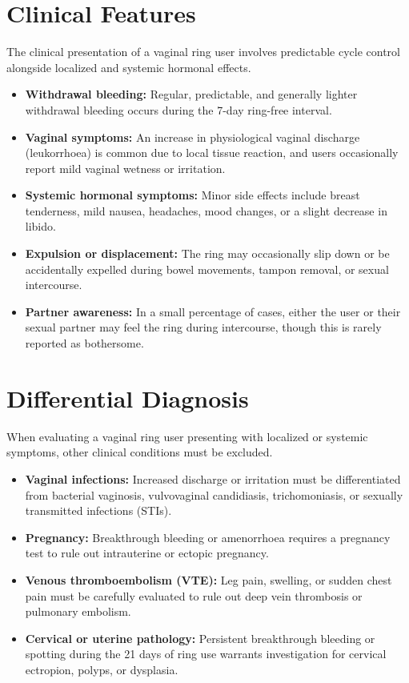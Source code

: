 \section*{Clinical Features}
The clinical presentation of a vaginal ring user involves predictable cycle control alongside localized and systemic hormonal effects.
\begin{itemize}
    \item \textbf{Withdrawal bleeding:} Regular, predictable, and generally lighter withdrawal bleeding occurs during the 7-day ring-free interval.
    \item \textbf{Vaginal symptoms:} An increase in physiological vaginal discharge (leukorrhoea) is common due to local tissue reaction, and users occasionally report mild vaginal wetness or irritation.
    \item \textbf{Systemic hormonal symptoms:} Minor side effects include breast tenderness, mild nausea, headaches, mood changes, or a slight decrease in libido.
    \item \textbf{Expulsion or displacement:} The ring may occasionally slip down or be accidentally expelled during bowel movements, tampon removal, or sexual intercourse.
    \item \textbf{Partner awareness:} In a small percentage of cases, either the user or their sexual partner may feel the ring during intercourse, though this is rarely reported as bothersome.
\end{itemize}

\section*{Differential Diagnosis}
When evaluating a vaginal ring user presenting with localized or systemic symptoms, other clinical conditions must be excluded.
\begin{itemize}
    \item \textbf{Vaginal infections:} Increased discharge or irritation must be differentiated from bacterial vaginosis, vulvovaginal candidiasis, trichomoniasis, or sexually transmitted infections (STIs).
    \item \textbf{Pregnancy:} Breakthrough bleeding or amenorrhoea requires a pregnancy test to rule out intrauterine or ectopic pregnancy.
    \item \textbf{Venous thromboembolism (VTE):} Leg pain, swelling, or sudden chest pain must be carefully evaluated to rule out deep vein thrombosis or pulmonary embolism.
    \item \textbf{Cervical or uterine pathology:} Persistent breakthrough bleeding or spotting during the 21 days of ring use warrants investigation for cervical ectropion, polyps, or dysplasia.
\end{itemize}

